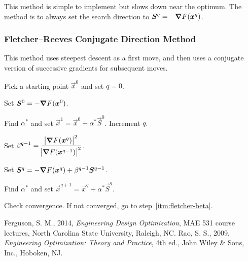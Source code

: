 \documentclass{article}
\begin{document}
This method is simple to implement but slows down near the optimum. The method is to always set the
search direction to \(\bm{S}^q = -\bm{\nabla} F(\bm{x}^q)\).

\subsubsection{Fletcher--Reeves Conjugate Direction Method}

This method uses steepest descent as a first move, and then uses a conjugate version of successive
gradients for subsequent moves.

\begin{enumerate*}
\item Pick a starting point \(\vec{x}^0\) and set \(q = 0\).
\item Set \(\bm{S}^0 = -\bm{\nabla} F(\bm{x}^0)\).
\item Find \(\alpha^*\) and set \(\vec{x}^1 = \vec{x}^0 + \alpha^* \vec{S}^0\). Increment \(q\).
\item \label{itm:fletcher-beta} Set \(\displaystyle \beta^{q-1} = \frac{{\abs{\bm{\nabla} F(\bm{x}^q)}}^2}{{\abs{\bm{\nabla} F(\bm{x}^{q-1})}}^2}\).
\item Set \(\bm{S}^q = -\bm{\nabla} F(\bm{x}^q) + \beta^{q-1} \bm{S}^{q-1}\).
\item Find \(\alpha^*\) and set \(\vec{x}^{q+1} = \vec{x}^q + \alpha^* \vec{S}^q\).
\item Check convergence. If not converged, go to step~\ref{itm:fletcher-beta}.
\end{enumerate*}

\begin{thebibliography}{99}
 Ferguson, S. M., 2014, \emph{Engineering Design Optimization}, MAE 531 course
  lectures, North Carolina State University, Raleigh, NC.
 Rao, S. S., 2009, \emph{Engineering Optimization: Theory and Practice}, 4th ed.,
  John Wiley \& Sons, Inc., Hoboken, NJ.
\end{thebibliography}
\end{document}
